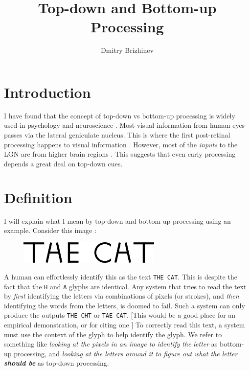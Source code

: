 \documentclass[10pt,a4paper]{article}
\begin{document}
\title{\vspace{-10ex}Top-down and Bottom-up Processing}
\author{Dmitry Brizhinev}
\maketitle

\section{Introduction}
I have found that the concept of top-down vs bottom-up processing is widely used in psychology and neuroscience \cite{citationneeded}. Most visual information from human eyes passes via the lateral geniculate nucleus. This is where the first post-retinal processing happens to visual information \cite{citationneeded}. However, most of the \emph{inputs} to the LGN are from higher brain regions \cite{citationneeded}. This suggests that even early processing depends a great deal on top-down cues.

\section{Definition}
I will explain what I mean by top-down and bottom-up processing using an example. Consider this image \cite{citationneeded}:

\begin{figure}[h!]
  \includegraphics[width=200pt]{thecat.png}
\end{figure}

A human can effortlessly identify this as the text \texttt{THE CAT}. This is despite the fact that the \texttt{H} and \texttt{A} glyphs are identical. Any system that tries to read the text by \emph{first} identifying the letters via combinations of pixels (or strokes), and \emph{then} identifying the words from the letters, is doomed to fail. Such a system can only produce the outputs \texttt{THE CHT} or \texttt{TAE CAT}. [This would be a good place for an empirical demonstration, or for citing one \cite{researchneeded}] To correctly read this text, a system must use the context of the glyph to help identify the glyph. We refer to something like \emph{looking at the pixels in an image to identify the letter} as bottom-up processing, and \emph{looking at the letters around it to figure out what the letter \textbf{should be}} as top-down processing.
\end{document}
